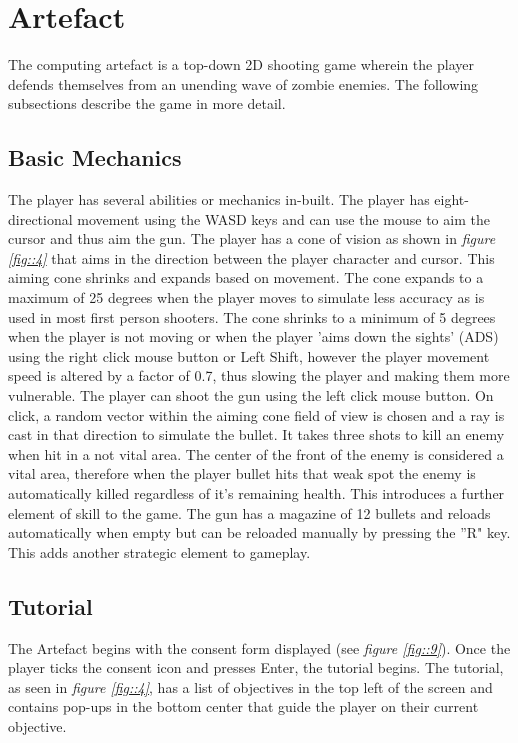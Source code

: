 \documentclass[journal]{IEEEtran}
\begin{document}
\section{Artefact}
The computing artefact is a top-down 2D shooting game wherein the player defends themselves from an unending wave of zombie enemies. The following subsections describe the game in more detail.

\subsection{Basic Mechanics}
The player has several abilities or mechanics in-built. The player has eight-directional movement using the WASD keys and can use the mouse to aim the cursor and thus aim the gun. 
The player has a cone of vision as shown in \textit{figure \ref{fig::4}} that aims in the direction between the player character and cursor. This aiming cone shrinks and expands based on movement. The cone expands to a maximum of 25 degrees when the player moves to simulate less accuracy as is used in most first person shooters. The cone shrinks to a minimum of 5 degrees when the player is not moving or when the player 'aims down the sights' (ADS) using the right click mouse button or Left Shift, however the player movement speed is altered by a factor of 0.7, thus slowing the player and making them more vulnerable. 
The player can shoot the gun using the left click mouse button. On click, a random vector within the aiming cone field of view is chosen and a ray is cast in that direction to simulate the bullet. It takes three shots to kill an enemy when hit in a not vital area. The center of the front of the enemy is considered a vital area, therefore when the player bullet hits that weak spot the enemy is automatically killed regardless of it's remaining health. This introduces a further element of skill to the game.
The gun has a magazine of 12 bullets and reloads automatically when empty but can be reloaded manually by pressing the ''R" key. This adds another strategic element to gameplay.

\subsection{Tutorial}
The Artefact begins with the consent form displayed (see \textit{figure \ref{fig::9}}). Once the player ticks the consent icon and presses Enter, the tutorial begins. The tutorial, as seen in \textit{figure \ref{fig::4}}, has a list of objectives in the top left of the screen and contains pop-ups in the bottom center that guide the player on their current objective. 
\end{document}
